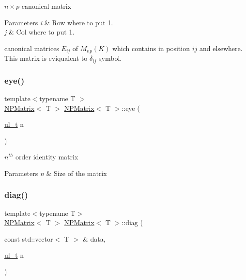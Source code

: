 $ n \times p $ canonical matrix 


\begin{DoxyParams}{Parameters}
{\em i} & Row where to put 1. \\
\hline
{\em j} & Col where to put 1.\\
\hline
\end{DoxyParams}
canonical matrices $ E_{ij} $ of $ M_{np}(K) $ which contains {} in position $ ij $ and {} elsewhere. This matrix is eviqualent to $ \delta_{ij} $ symbol. \mbox{\label{class_n_p_matrix_a38961696b973ca0ff6ac098580c6974f}} 
\subsubsection{\texorpdfstring{eye()}{eye()}}
{\footnotesize\ttfamily template$<$typename T $>$ \\
\mbox{\hyperlink{class_n_p_matrix}{N\+P\+Matrix}}$<$ T $>$ \mbox{\hyperlink{class_n_p_matrix}{N\+P\+Matrix}}$<$ T $>$\+::eye (\begin{DoxyParamCaption}\item[{\mbox{\hyperlink{typedef_8h_a1b140a2034db3f5dfe18a987745df43a}{ul\+\_\+t}}}]{n }\end{DoxyParamCaption})\hspace{0.3cm}{\ttfamily [static]}}



$ n^{th} $ order identity matrix 


\begin{DoxyParams}{Parameters}
{\em n} & Size of the matrix \\
\hline
\end{DoxyParams}
\mbox{\label{class_n_p_matrix_ae73ef1ba99fe04c35af30adc3bfbd1dc}} 
\subsubsection{\texorpdfstring{diag()}{diag()}}
{\footnotesize\ttfamily template$<$typename T$>$ \\
\mbox{\hyperlink{class_n_p_matrix}{N\+P\+Matrix}}$<$ T $>$ \mbox{\hyperlink{class_n_p_matrix}{N\+P\+Matrix}}$<$ T $>$\+::diag (\begin{DoxyParamCaption}\item[{const std\+::vector$<$ T $>$ \&}]{data,  }\item[{\mbox{\hyperlink{typedef_8h_a1b140a2034db3f5dfe18a987745df43a}{ul\+\_\+t}}}]{n }\end{DoxyParamCaption})\hspace{0.3cm}{\ttfamily [static]}}



